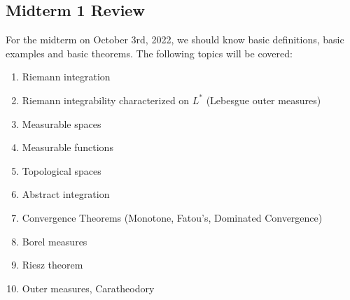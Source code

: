 \subsection*{Midterm 1 Review}
For the midterm on October 3rd, 2022, we should know basic definitions, basic examples and basic theorems. The following topics will be covered:
\begin{enumerate}
	\item Riemann integration
	\item Riemann integrability characterized on $L^*$ (Lebesgue outer measures)
	\item Measurable spaces
	\item Measurable functions
	\item Topological spaces
	\item Abstract integration
	\item Convergence Theorems (Monotone, Fatou's, Dominated Convergence)
	\item Borel measures
	\item Riesz theorem
	\item Outer measures, Caratheodory
\end{enumerate}
